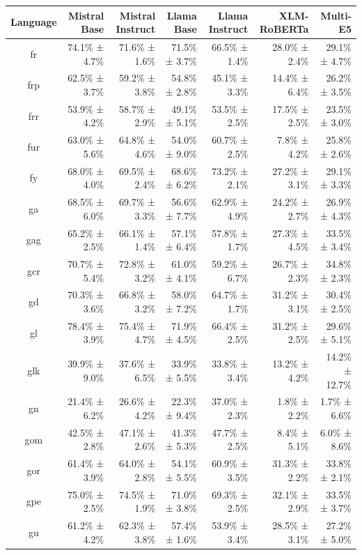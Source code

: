 \documentclass[10pt, a4paper]{article}
\begin{document}
\begin{table}[h]
\centering
\scriptsize
\begin{tabular}{crrrrrr}
\toprule
Language & Mistral Base & Mistral Instruct & Llama Base & Llama Instruct & XLM-RoBERTa & Multi-E5 \\
\midrule
fr & 74.1\% ± 4.7\% & 71.6\% ± 1.6\% & 71.5\% ± 3.7\% & 66.5\% ± 1.4\% & 28.0\% ± 2.4\% & 29.1\% ± 4.7\% \\
frp & 62.5\% ± 3.7\% & 59.2\% ± 3.8\% & 54.8\% ± 2.8\% & 45.1\% ± 3.3\% & 14.4\% ± 6.4\% & 26.2\% ± 3.5\% \\
frr & 53.9\% ± 4.2\% & 58.7\% ± 2.9\% & 49.1\% ± 5.1\% & 53.5\% ± 2.5\% & 17.5\% ± 2.5\% & 23.5\% ± 3.0\% \\
fur & 63.0\% ± 5.6\% & 64.8\% ± 4.6\% & 54.0\% ± 9.0\% & 60.7\% ± 2.5\% & 7.8\% ± 4.2\% & 25.8\% ± 2.6\% \\
fy & 68.0\% ± 4.0\% & 69.5\% ± 2.4\% & 68.6\% ± 6.2\% & 73.2\% ± 2.1\% & 27.2\% ± 3.1\% & 29.1\% ± 3.3\% \\
ga & 68.5\% ± 6.0\% & 69.7\% ± 3.3\% & 56.6\% ± 7.7\% & 62.9\% ± 4.9\% & 24.2\% ± 2.7\% & 26.9\% ± 4.3\% \\
gag & 65.2\% ± 2.5\% & 66.1\% ± 1.4\% & 57.1\% ± 6.4\% & 57.8\% ± 1.7\% & 27.3\% ± 4.5\% & 33.5\% ± 3.4\% \\
gcr & 70.7\% ± 5.4\% & 72.8\% ± 3.2\% & 61.0\% ± 4.1\% & 59.2\% ± 6.7\% & 26.7\% ± 2.3\% & 34.8\% ± 2.3\% \\
gd & 70.3\% ± 3.6\% & 66.8\% ± 3.2\% & 58.0\% ± 7.2\% & 64.7\% ± 1.7\% & 31.2\% ± 3.1\% & 30.4\% ± 2.5\% \\
gl & 78.4\% ± 3.9\% & 75.4\% ± 4.7\% & 71.9\% ± 4.5\% & 66.4\% ± 2.5\% & 31.2\% ± 2.5\% & 29.6\% ± 5.1\% \\
glk & 39.9\% ± 9.0\% & 37.6\% ± 6.5\% & 33.9\% ± 5.5\% & 33.8\% ± 3.4\% & 13.2\% ± 4.2\% & 14.2\% ± 12.7\% \\
gn & 21.4\% ± 6.2\% & 26.6\% ± 4.2\% & 22.3\% ± 9.4\% & 37.0\% ± 2.3\% & 1.8\% ± 2.2\% & 1.7\% ± 6.6\% \\
gom & 42.5\% ± 2.8\% & 47.1\% ± 2.6\% & 41.3\% ± 5.3\% & 47.7\% ± 2.5\% & 8.4\% ± 5.1\% & 6.0\% ± 8.6\% \\
gor & 61.4\% ± 3.9\% & 64.0\% ± 2.8\% & 54.1\% ± 5.5\% & 60.9\% ± 3.5\% & 31.3\% ± 2.2\% & 33.8\% ± 2.1\% \\
gpe & 75.0\% ± 2.5\% & 74.5\% ± 1.9\% & 71.0\% ± 3.8\% & 69.3\% ± 2.5\% & 32.1\% ± 2.9\% & 33.5\% ± 3.7\% \\
gu & 61.2\% ± 4.2\% & 62.3\% ± 3.8\% & 57.4\% ± 1.6\% & 53.9\% ± 3.4\% & 28.5\% ± 3.1\% & 27.2\% ± 5.0\% \\

\end{tabular}
\end{table}
\end{document}
